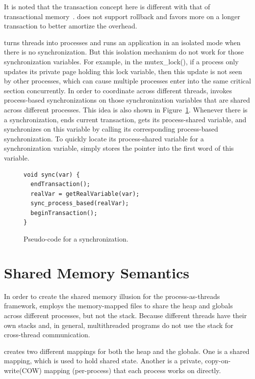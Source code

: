 It is noted that the transaction concept here is different with that of transactional memory~\cite{transaction}. \sheriff{} does not support rollback and favors more on a longer transaction to better amortize the overhead. 

\sheriff{} turns threads into processes and runs an application in an isolated mode when there is no synchronization. But this isolation mechanism do not work for those synchronization variables. For example, in the mutex\_lock(), if a process only updates its private page holding this lock variable, then this update is not seen by other processes, which can cause multiple processes enter into the same critical section concurrently. In order to coordinate across different threads, \sheriff{} invokes process-based synchronizations on those synchronization variables that are shared across different processes. This idea is also shown in Figure~\ref{fig:synccode}. Whenever there is a synchronization, \sheriff{} ends current transaction, gets its process-shared variable, and synchronizes on this variable by calling its corresponding process-based synchronization. To quickly locate its process-shared variable for a synchronization variable, \sheriff{} simply stores the pointer into the first word of this variable. 
 
\begin{figure}[!t]
\small
\begin{lstlisting}[style=tt]
void sync(var) {
  endTransaction();
  realVar = getRealVariable(var);
  sync_process_based(realVar);	
  beginTransaction();
}
\end{lstlisting}
\caption{Pseudo-code for a synchronization.\label{fig:synccode}}
\end{figure}

\section{Shared Memory Semantics}
\label{sec:sharedmemory}

In order to create the shared memory illusion for the process-as-threads framework, \sheriff{} employs the memory-mapped files to share the heap and globals across different processes, but not the stack. Because different threads have their own stacks and, in general, multithreaded programs do not use the stack for cross-thread communication.

\sheriff{} creates two different mappings for both the heap and the globals. One is a shared mapping, which is used to hold shared state. Another is a private, copy-on-write(COW) mapping (per-process) that each process works on directly.

